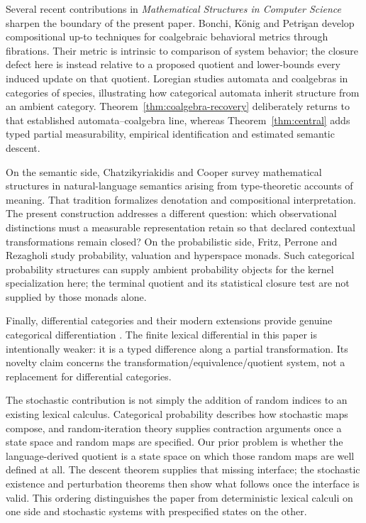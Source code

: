 \documentclass[11pt]{article}
\begin{document}
{Several recent contributions in \emph{Mathematical Structures in Computer Science} sharpen the boundary of the present paper. Bonchi, K\"onig and Petri\c{s}an \cite{bonchi2023} develop compositional up-to techniques for coalgebraic behavioral metrics through fibrations. Their metric is intrinsic to comparison of system behavior; the closure defect here is instead relative to a proposed quotient and lower-bounds every induced update on that quotient. Loregian \cite{loregian2025} studies automata and coalgebras in categories of species, illustrating how categorical automata inherit structure from an ambient category. Theorem~\ref{thm:coalgebra-recovery} deliberately returns to that established automata--coalgebra line, whereas Theorem~\ref{thm:central} adds typed partial measurability, empirical identification and estimated semantic descent.

On the semantic side, Chatzikyriakidis and Cooper \cite{chatzikyriakidis2026} survey mathematical structures in natural-language semantics arising from type-theoretic accounts of meaning. That tradition formalizes denotation and compositional interpretation. The present construction addresses a different question: which observational distinctions must a measurable representation retain so that declared contextual transformations remain closed? On the probabilistic side, Fritz, Perrone and Rezagholi \cite{fritz2022} study probability, valuation and hyperspace monads. Such categorical probability structures can supply ambient probability objects for the kernel specialization here; the terminal quotient and its statistical closure test are not supplied by those monads alone.

Finally, differential categories and their modern extensions provide genuine categorical differentiation \cite{blute2006,cockett2025}. The finite lexical differential in this paper is intentionally weaker: it is a typed difference along a partial transformation. Its novelty claim concerns the transformation/equivalence/quotient system, not a replacement for differential categories.

The stochastic contribution is not simply the addition of random indices to
an existing lexical calculus.  Categorical probability describes how
stochastic maps compose, and random-iteration theory supplies contraction
arguments once a state space and random maps are specified.  Our prior problem
is whether the language-derived quotient is a state space on which those
random maps are well defined at all.  The descent theorem supplies that
missing interface; the stochastic existence and perturbation theorems then
show what follows once the interface is valid.  This ordering distinguishes
the paper from deterministic lexical calculi on one side and stochastic
systems with prespecified states on the other.

}
\end{document}
